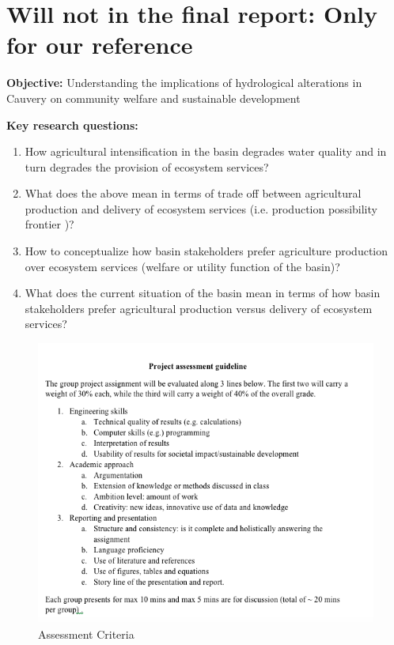 \section{Will not in the final report: Only for our reference}

\textbf{Objective:} Understanding the implications of hydrological alterations in Cauvery on community welfare and sustainable development

\textbf{Key research questions: }
\begin{enumerate}
    \item How agricultural intensification in the basin degrades water quality and in turn degrades  the provision of ecosystem services?
    \item What does the above mean in terms of trade off between agricultural production and delivery of ecosystem services (i.e. production possibility frontier )?
    \item How to conceptualize how basin stakeholders prefer agriculture  production over ecosystem services (welfare or utility function of the basin)?
    \item What does the current situation of the basin mean in terms of how basin stakeholders prefer agricultural production versus  delivery of ecosystem services?
    
\end{enumerate}

\begin{figure}[H]
    \centering
    \includegraphics[scale = 0.8]{Not_Used_EXTRA/Assessment.png}
    \caption{Assessment Criteria}
    \label{fig:AC}
\end{figure}